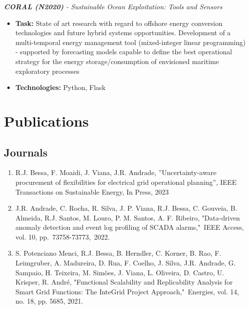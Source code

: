 \documentclass{mycv}
\begin{document}
{\begin{myitemize}
	\vspace{0.15cm}	
	\item \textit{\textbf{CORAL (N2020)} - Sustainable Ocean Exploitation: Tools and Sensors}
	\begin{itemize}
		\item \textbf{Task:} State of art research with regard to offshore energy conversion technologies and future hybrid systems opportunities. Development of a multi-temporal energy management tool (mixed-integer linear programming) - supported by forecasting models capable to define the best operational strategy for the energy storage/consumption of envisioned maritime exploratory processes
		\item \textbf{Technologies:} Python, Flask
	\end{itemize}
	
	
\end{myitemize}


\section{Publications}

\vspace{0.4cm}

\subsection{Journals}

\begin{enumerate}
	
	\item R.J. Bessa, F. Moaidi, J. Viana, J.R. Andrade, ”Uncertainty-aware procurement of flexibilities for electrical grid operational planning”, IEEE Transactions on Sustainable Energy, In Press, 2023
	
	\item J.R. Andrade, C. Rocha, R. Silva, J. P. Viana, R.J. Bessa, C. Gouveia, B. Almeida, R.J. Santos, M. Louro, P. M. Santos, A. F. Ribeiro, "Data-driven anomaly detection and event log profiling of SCADA alarms," IEEE Access, vol. 10, pp. 73758-73773, 2022.
	
	\item S. Potenciano Menci, R.J. Bessa, B. Herndler, C. Korner, B. Rao, F. Leimgruber, A. Madureira, D. Rua, F. Coelho, J. Silva, J.R. Andrade, G. Sampaio, H. Teixeira, M. Simões, J. Viana, L. Oliveira, D. Castro, U. Krisper, R. André, "Functional Scalability and Replicability Analysis for Smart Grid Functions: The InteGrid Project Approach," Energies,  vol. 14, no. 18, pp. 5685, 2021.
	

\end{enumerate}}
\end{document}
